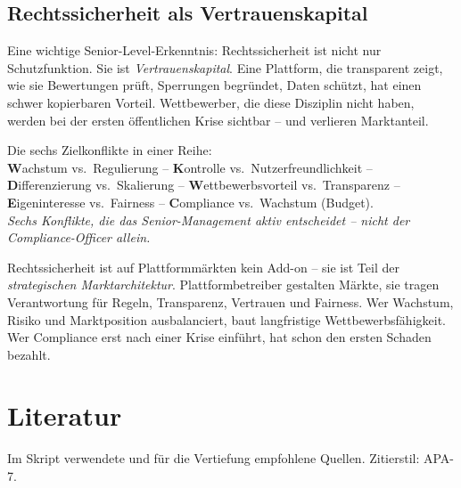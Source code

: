 \documentclass[11pt,a4paper,oneside]{article}
\newcommand{\caveatfontfallback}{\itshape}
\newcommand\caveatfont{\caveatfontfallback}%
\newcommand{\akzent}[1]{{\caveatfont\color{lpAmber}#1}}
\begin{document}
\subsection{Rechtssicherheit als Vertrauenskapital}

Eine wichtige Senior-Level-Erkenntnis: Rechtssicherheit ist nicht nur Schutzfunktion. Sie ist \emph{Vertrauenskapital}. Eine Plattform, die transparent zeigt, wie sie Bewertungen prüft, Sperrungen begründet, Daten schützt, hat einen schwer kopierbaren Vorteil. Wettbewerber, die diese Disziplin nicht haben, werden bei der ersten öffentlichen Krise sichtbar -- und verlieren Marktanteil.

\begin{eselsbox}[Eselsbrücke: \akzent{W-K-D-W-E-C}]
Die sechs Zielkonflikte in einer Reihe:\\[2pt]
\textbf{W}achstum vs.\ Regulierung -- \textbf{K}ontrolle vs.\ Nutzerfreundlichkeit -- \textbf{D}ifferenzierung vs.\ Skalierung -- \textbf{W}ettbewerbsvorteil vs.\ Transparenz -- \textbf{E}igeninteresse vs.\ Fairness -- \textbf{C}ompliance vs.\ Wachstum (Budget).\\[2pt]
\emph{Sechs Konflikte, die das Senior-Management aktiv entscheidet -- nicht der Compliance-Officer allein.}
\end{eselsbox}

\begin{merkbox}
Rechtssicherheit ist auf Plattformmärkten kein Add-on -- sie ist Teil der \emph{strategischen Marktarchitektur}. Plattformbetreiber gestalten Märkte, sie tragen Verantwortung für Regeln, Transparenz, Vertrauen und Fairness. Wer Wachstum, Risiko und Marktposition ausbalanciert, baut langfristige Wettbewerbsfähigkeit. Wer Compliance erst nach einer Krise einführt, hat schon den ersten Schaden bezahlt.
\end{merkbox}

\clearpage
\section{Literatur}

Im Skript verwendete und für die Vertiefung empfohlene Quellen. Zitierstil: APA-7.
\end{document}
